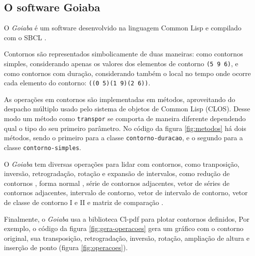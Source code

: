 \documentclass{sciposter}
\newcommand{\goiaba}[1]{\textit{Goiaba}}
\newcommand{\code}[1]{\texttt{#1}}
\begin{document}
\begin{multicols}{3}
\section{O software Goiaba}

O \goiaba{} é um software desenvolvido na linguagem Common Lisp
\cite{graham94:lisp} e compilado com o SBCL \cite{team07:sbcl}.

Contornos são representados simbolicamente de duas maneiras: como
contornos simples, considerando apenas os valores dos elementos de
contorno \code{(5 9 6)}, e como contornos com duração, considerando
também o local no tempo onde ocorre cada elemento do contorno:
\code{((0 5)(1 9)(2 6))}.

As operações em contornos são implementadas em métodos, aproveitando
do despacho múltiplo usado pelo sistema de objetos de Common Lisp
(CLOS). Desse modo um método como \texttt{transpor} se comporta de
maneira diferente dependendo qual o tipo do seu primeiro parâmetro. No
código da figura \ref{fig:metodos} há dois métodos, sendo o primeiro
para a classe \code{contorno-duracao}, e o segundo para a classe
\code{contorno-simples}.

O \goiaba{} tem diversas operações para lidar com contornos, como
tranposição, inversão, retrogradação, rotação e expansão de
intervalos, como redução de contornos \cite{adams76:melodic}, forma
normal \cite{marvin.ea87:relating}, série de contornos adjacentes,
vetor de séries de contornos adjacentes, intervalo de contorno, vetor
de intervalo de contorno, vetor de classe de contorno I e II
\cite{friedmann85:methodology} e matriz de comparação
\cite{morris93:directions}.

Finalmente, o \goiaba{} usa a biblioteca Cl-pdf para plotar contornos
definidos, Por exemplo, o código da figura \ref{fig:gera-operacoes}
gera um gráfico com o contorno original, sua transposição,
retrogradação, inversão, rotação, ampliação de altura e inserção de
ponto (figura \ref{fig:operacoes}).

\end{multicols}
\end{document}
